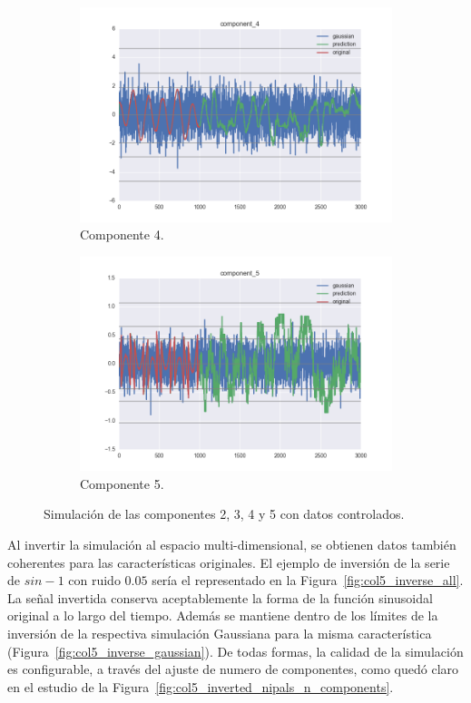 \documentclass[11pt,spanish,listoffigures,listoftables]{tfgetsinf}
\begin{document}
\begin{figure}[H]
\begin{subfigure}[h]{0.49\textwidth}
            \includegraphics[width=\textwidth]{simulated_data_8_columns/component_4.png}
            \caption{Componente 4.}
            \label{fig:component_4}
        \end{subfigure}
        \begin{subfigure}[h]{0.49\textwidth}
            \centering
            \includegraphics[width=\textwidth]{simulated_data_8_columns/component_5.png}
            \caption{Componente 5.}
            \label{fig:component_5}
        \end{subfigure}
        \caption{Simulación de las componentes 2, 3, 4 y 5 con datos controlados.}
        \label{fig:component_x}
    \end{figure}
    
    Al invertir la simulación al espacio multi-dimensional, se obtienen datos también coherentes para las características originales. El ejemplo de inversión de la serie de \(sin - 1\) con ruido \(0.05\) sería el representado en la Figura~\ref{fig:col5_inverse_all}. La señal invertida conserva aceptablemente la forma de la función sinusoidal original a lo largo del tiempo. Además se mantiene dentro de los límites de la inversión de la respectiva simulación Gaussiana para la misma característica (Figura~\ref{fig:col5_inverse_gaussian}). De todas formas, la calidad de la simulación es configurable, a través del ajuste de numero de componentes, como quedó claro en el estudio de la Figura~\ref{fig:col5_inverted_nipals_n_components}.
\end{document}
